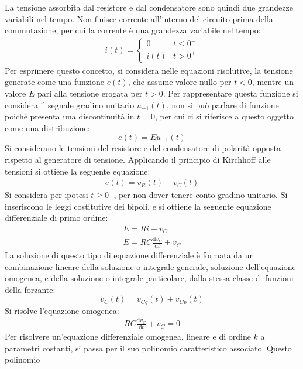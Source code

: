 \documentclass{article}
\newcommand{\df}{\mathrm{d}}
\numberwithin{equation}{subsection}
\begin{document}
La tensione assorbita dal resistore e dal condensatore sono quindi due grandezze variabili nel tempo. Non fluisce corrente all'interno del circuito prima della 
commutazione, per cui la corrente è una grandezza variabile nel tempo:
\begin{gather*}
    i(t)=\begin{cases}
        0&t\leq0^-\\
        i(t)&t>0^+
    \end{cases}
\end{gather*}
Per esprimere questo concetto, si considera nelle equazioni risolutive, la tensione generate come una funzione $e(t)$, che assume valore nullo per $t<0$, mentre un valore 
$E$ pari alla tensione erogata per $t>0$. Per rappresentare questa funzione si considera il segnale gradino unitario $u_{-1}(t)$, non si può parlare di funzione poiché 
presenta una discontinuità in $t=0$, per cui ci si riferisce a questo oggetto come una distribuzione:
\begin{equation*}
    e(t)=Eu_{-1}(t)
\end{equation*} Si considerano le tensioni del resistore e del condensatore di polarità 
opposta rispetto al generatore di tensione. Applicando il principio di Kirchhoff alle tensioni si ottiene la seguente equazione:
\begin{gather*}
    e(t)=v_R(t)+v_C(t)
\end{gather*}
Si considera per ipotesi $t\geq0^+$, per non dover tenere conto gradino unitario. Si inseriscono le leggi costitutive dei bipoli, e si ottiene la seguente equazione 
differenziale di primo ordine:
\begin{gather*}
    E=Ri+v_C\\
    E=RC\displaystyle\frac{\df v_C}{\df t}+v_C
\end{gather*}
La soluzione di questo tipo di equazione differenziale è formata da un combinazione lineare della soluzione o integrale generale, soluzione dell'equazione omogenea, e 
della soluzione o integrale particolare, dalla stessa classe di funzioni della forzante:
\begin{equation*}
    v_C(t)=v_{Cg}(t)+v_{Cp}(t)
\end{equation*}
Si risolve l'equazione omogenea:
\begin{gather*}
    RC\displaystyle\frac{\df v_C}{\df t}+v_C=0
\end{gather*}
Per risolvere un'equazione differenziale omogenea, lineare e di ordine $k$ a parametri costanti, si passa per il suo polinomio caratteristico associato. Questo polinomio 
\end{document}
